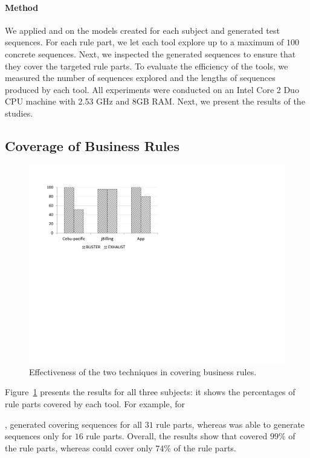 \paragraph*{Method} We applied \tool{} and \exhaust{} on the models created for each subject and
generated test sequences. For each rule part, we let each tool explore up to a
maximum of $100$ concrete sequences. Next, we inspected the generated sequences
to ensure that they cover the targeted rule parts. To evaluate the efficiency of
the tools, we measured the number of sequences explored and the lengths of
sequences produced by each tool.  All experiments were conducted on an Intel
Core 2 Duo CPU machine with 2.53 GHz and 8GB RAM. Next, we present the results
of the studies.

\subsection{Coverage of Business Rules}

\begin{figure}[t]
\centering
\includegraphics[width=0.65\columnwidth, clip, trim = 18mm 120mm 140mm
  18mm]{figs/Study-1.pdf}
\vspace*{-10pt}
\caption{Effectiveness of the two techniques in covering business rules.}
\label{fig:effectiveness}
\end{figure}

Figure~\ref{fig:effectiveness} presents the results for all three subjects: it
shows the percentages of rule parts covered by each tool. For example, for
\subject{Cebu-pacific}, \tool{} generated covering sequences for all $31$ rule
parts, whereas \exhaust{} was able to generate sequences only for $16$ rule
parts. Overall, the results show that \tool{} covered $99$\% of the rule parts,
whereas \exhaust{} could cover only $74$\% of the rule parts.

